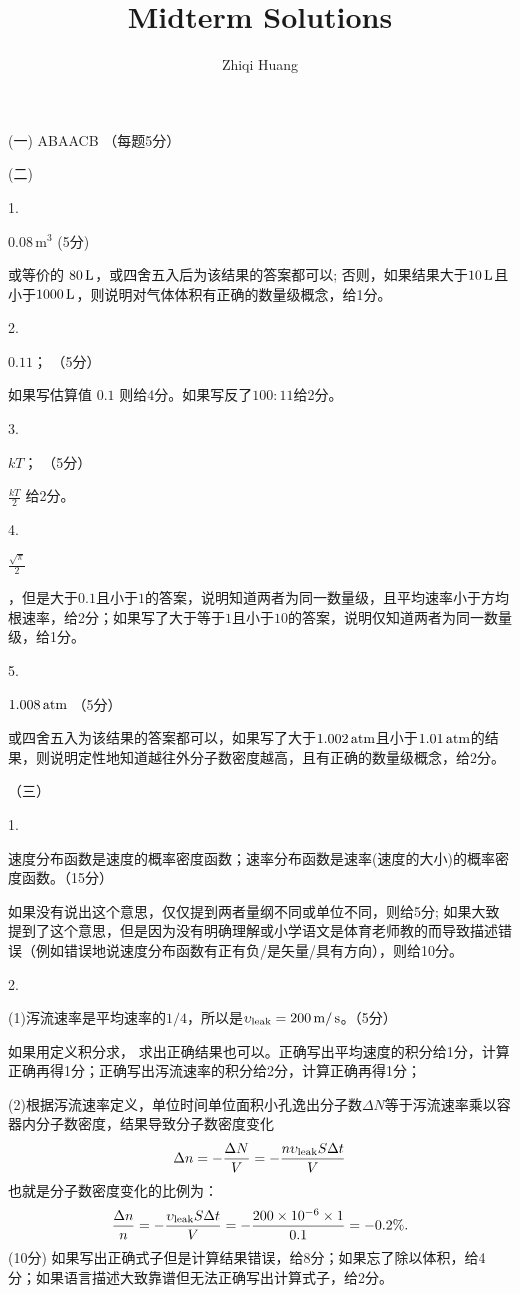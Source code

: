 \documentclass[12pt,CJK]{article}
\begin{document}
\bch
\title{Midterm Solutions}
\author{Zhiqi Huang}
\date{}
\maketitle

(一) ABAACB （每题5分）


(二) \bitem
\item[1.]{$0.08\,\mathrm{m}^3$ (5分)

 {\gray 或等价的 $80\,\mathrm{L}$，或四舍五入后为该结果的答案都可以; 否则，如果结果大于$10\,\mathrm{L}$且小于$1000\,\mathrm{L}$，则说明对气体体积有正确的数量级概念，给1分。} }
\item[2.]{$0.11$； （5分）

  {\gray 如果写估算值 $0.1$ 则给4分。如果写反了$100:11$给2分。} }
\item[3.]{$kT$； （5分）

  { $\frac{kT}{2}$ 给2分。}}
\item[4.]{$\frac{\sqrt{\pi}}{2}$

  {，但是大于$0.1$且小于$1$的答案，说明知道两者为同一数量级，且平均速率小于方均根速率，给2分；如果写了大于等于$1$且小于$10$的答案，说明仅知道两者为同一数量级，给1分。}}
\item[5.]{$1.008\,\mathrm{atm}$  （5分）

  {\gray 或四舍五入为该结果的答案都可以，如果写了大于$1.002\,\mathrm{atm}$且小于$1.01\,\mathrm{atm}$的结果，则说明定性地知道越往外分子数密度越高，且有正确的数量级概念，给2分。}}
  \eitem

  （三）
  \bitem
\item[1.]{速度分布函数是速度的概率密度函数；速率分布函数是速率(速度的大小)的概率密度函数。（15分）

  {\gray 如果没有说出这个意思，仅仅提到两者量纲不同或单位不同，则给5分; 如果大致提到了这个意思，但是因为没有明确理解或小学语文是体育老师教的而导致描述错误（例如错误地说速度分布函数有正有负/是矢量/具有方向），则给10分。}
}
\item[2.]{

  (1)泻流速率是平均速率的$1/4$，所以是$\upsilon_{\rm leak} = 200\,\mathrm{m}/\,\mathrm{s}$。（5分）

  {\gray 如果用定义积分求， 求出正确结果也可以。正确写出平均速度的积分给1分，计算正确再得1分；正确写出泻流速率的积分给2分，计算正确再得1分；}

  (2)根据泻流速率定义，单位时间单位面积小孔逸出分子数$\Delta N$等于泻流速率乘以容器内分子数密度，结果导致分子数密度变化
  $$\Delta n = -\frac{\Delta N}{V} = - \frac{n \upsilon_{\rm leak} S \Delta t}{V}$$
  也就是分子数密度变化的比例为：
  $$\frac{\Delta n}{n} = - \frac{ \upsilon_{\rm leak} S \Delta t}{V} = -\frac{200\times 10^{-6}\times 1}{0.1} = -0.2\%.$$
  (10分)
{\gray 如果写出正确式子但是计算结果错误，给8分；如果忘了除以体积，给4分；如果语言描述大致靠谱但无法正确写出计算式子，给2分。}
}
\end{document}
